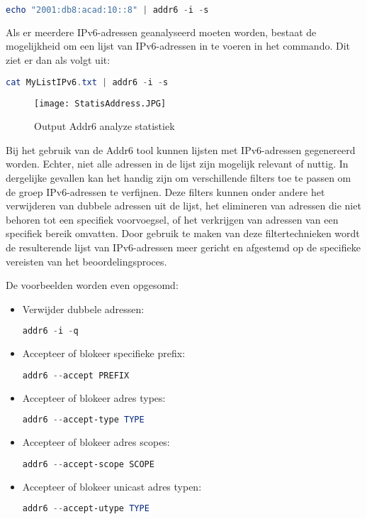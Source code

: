 \begin{lstlisting}[language=PowerShell,style=PowerShellStyle]
    echo "2001:db8:acad:10::8" | addr6 -i -s
\end{lstlisting}
Als er meerdere IPv6-adressen geanalyseerd moeten worden, bestaat de mogelijkheid om een lijst van IPv6-adressen in te voeren in het commando. Dit ziet er dan als volgt uit:
\begin{lstlisting}[language=PowerShell,style=PowerShellStyle]
    cat MyListIPv6.txt | addr6 -i -s
\end{lstlisting}

\begin{figure}[H]
    \texttt{[image: StatisAddress.JPG]}
    \caption{
        Output Addr6 analyze statistiek }
        \label{fig:StatisAddress}
\end{figure} 



Bij het gebruik van de Addr6 tool kunnen lijsten met IPv6-adressen gegenereerd worden. Echter, niet alle adressen in de lijst zijn mogelijk relevant of nuttig. In dergelijke gevallen kan het handig zijn om verschillende filters toe te passen om de groep IPv6-adressen te verfijnen. Deze filters kunnen onder andere het verwijderen van dubbele adressen uit de lijst, het elimineren van adressen die niet behoren tot een specifiek voorvoegsel, of het verkrijgen van adressen van een specifiek bereik omvatten. Door gebruik te maken van deze filtertechnieken wordt de resulterende lijst van IPv6-adressen meer gericht en afgestemd op de specifieke vereisten van het beoordelingsproces.

De voorbeelden worden even opgesomd: 

\begin{itemize}
    \item  Verwijder dubbele adressen:
    \begin{lstlisting}[language=PowerShell,style=PowerShellStyle]
        addr6 -i -q
    \end{lstlisting}
    \item Accepteer of blokeer specifieke prefix: 
    \begin{lstlisting}[language=PowerShell,style=PowerShellStyle]
        addr6 --accept PREFIX
    \end{lstlisting}
    \item Accepteer of blokeer adres types:
    \begin{lstlisting}[language=PowerShell,style=PowerShellStyle]
        addr6 --accept-type TYPE
    \end{lstlisting}
  \item Accepteer of blokeer adres scopes:
  \begin{lstlisting}[language=PowerShell,style=PowerShellStyle]
      addr6 --accept-scope SCOPE
        \end{lstlisting}
    \item Accepteer of blokeer unicast adres typen:
  \begin{lstlisting}[language=PowerShell,style=PowerShellStyle]
      addr6 --accept-utype TYPE
      \end{lstlisting}
\end{itemize}


